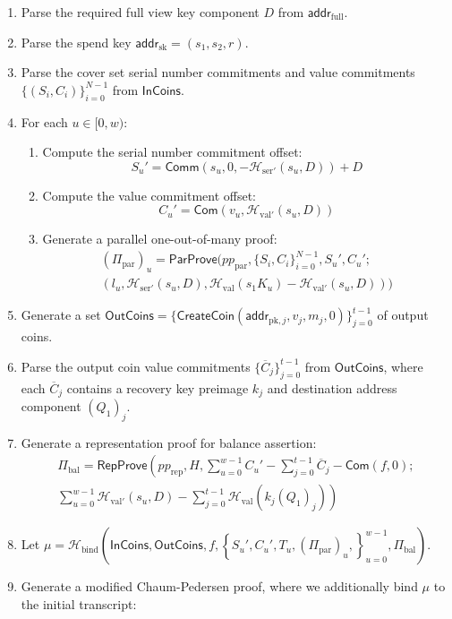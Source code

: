 \documentclass{llncs}
\newcommand{\hash}{\mathcal{H}}
\newcommand{\func}[1]{\mathsf{#1}}
\newcommand{\addr}{\func{addr}}
\newcommand{\com}{\func{Com}}
\newcommand{\comm}{\func{Comm}}
\begin{document}
\begin{enumerate}
    \item Parse the required full view key component $D$ from $\addr_{\text{full}}$.
    \item Parse the spend key $\addr_{\text{sk}} = (s_1, s_2, r)$.
    \item Parse the cover set serial number commitments and value commitments $\{(S_i, C_i)\}_{i=0}^{N-1}$ from $\func{InCoins}$.
    \item For each $u \in [0,w)$:
    \begin{enumerate}
        \item Compute the serial number commitment offset: $$S_u' = \comm(s_u, 0, -\hash_{\text{ser}'}(s_u, D)) + D$$
        \item Compute the value commitment offset: $$C_u' = \com(v_u, \hash_{\text{val}'}(s_u, D))$$
        \item Generate a parallel one-out-of-many proof:
        \begin{multline*}
        (\Pi_{\text{par}})_u = \func{ParProve}(pp_{\text{par}},\{S_i, C_i\}_{i=0}^{N-1}, S_u',C_u'; \\
        (l_u, \hash_{\text{ser}'}(s_u, D), \hash_{\text{val}}(s_1 K_u) - \hash_{\text{val}'}(s_u, D)))
        \end{multline*}
    \end{enumerate}
    \item Generate a set $\func{OutCoins} = \{\func{CreateCoin}(\addr_{\text{pk},j}, v_j, m_j, 0)\}_{j=0}^{t-1}$ of output coins.
    \item Parse the output coin value commitments $\{\overline{C}_j\}_{j=0}^{t-1}$ from $\func{OutCoins}$, where each $\overline{C}_j$ contains a recovery key preimage $k_j$ and destination address component $(Q_1)_j$.
    \item Generate a representation proof for balance assertion:
    \begin{multline*}
    \Pi_{\text{bal}} = \func{RepProve}\left( pp_{\text{rep}}, H, \sum_{u=0}^{w-1} C_u' - \sum_{j=0}^{t-1} \overline{C}_j - \com(f,0); \right. \\
    \left. \sum_{u=0}^{w-1} \hash_{\text{val}'}(s_u,D) - \sum_{j=0}^{t-1} \hash_{\text{val}}(k_j(Q_1)_j) \right)
    \end{multline*}
    \item Let $\mu = \hash_{\text{bind}}( \func{InCoins}, \func{OutCoins}, f, \left\{ S_u', C_u', T_u, (\Pi_{\text{par}})_u, \right\}_{u=0}^{w-1}, \Pi_{\text{bal}} )$.
    \item Generate a modified Chaum-Pedersen proof, where we additionally bind $\mu$ to the initial transcript:

\end{enumerate}
\end{document}
